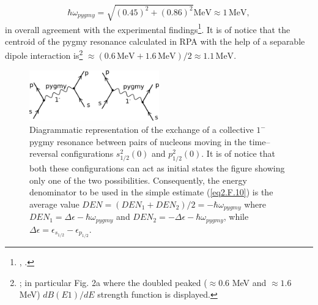 \begin{equation}
\hbar \omega_{pygmy}=\sqrt{(0.45)^2+(0.86)^2}\text{MeV}\approx 1\, \text{MeV},
\end{equation}  
 in overall agreement with the experimental findings\footnote{\cite{Zinser:97}, \cite{Kanungo:15}.}. It is of notice that the centroid of the pygmy resonance calculated in  RPA with the help of a separable dipole interaction is\footnote{\cite{Barranco:01}; in particular  Fig. 2a where the doubled peaked ($\approx0.6$ MeV and $\approx1.6$ MeV) $dB(E1)/dE$ strength function is displayed.} $\approx (0.6\,\text{MeV}+ 1.6\, \text{MeV})/2\approx 1.1\, \text{MeV}$.
 \begin{figure}
 \centerline{\includegraphics*[width=0.5\textwidth,angle=0]{nutshell/figs/pigmy.pdf}}
 \caption{Diagrammatic representation of the exchange of a collective $1^-$ pygmy resonance between pairs of nucleons moving in the time--reversal configurations $s_{1/2}^2(0)$ and $p_{1/2}^2(0)$. It is of notice that both these configurations can act as initial states  the figure showing only one of the two possibilities. Consequently, the energy denominator to be used in the simple estimate (\ref{eq2.F.10}) is the average value $DEN=(DEN_1+DEN_2)/2=-\hbar\omega_{pygmy}$ where $DEN_1=\Delta \epsilon-\hbar\omega_{pygmy}$ and $DEN_2=-\Delta\epsilon-\hbar\omega_{pygmy}$, while $\Delta\epsilon=\epsilon_{s_{1/2}}-\epsilon_{p_{1/2}}$.}\label{pigmy}
 \end{figure}

